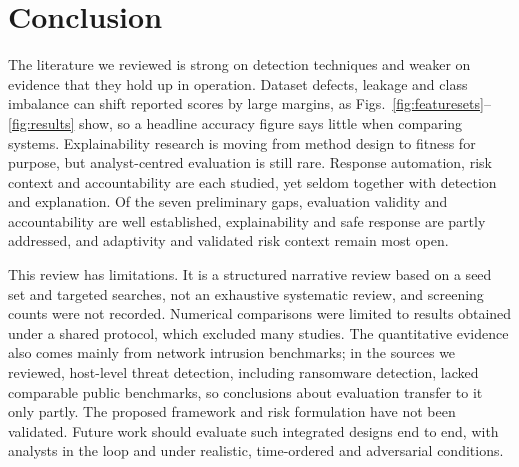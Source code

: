 \documentclass[conference]{IEEEtran}
\begin{document}
\section{Conclusion}
The literature we reviewed is strong on detection techniques and weaker on evidence that they hold up in operation. Dataset defects, leakage and class imbalance can shift reported scores by large margins, as Figs.~\ref{fig:featuresets}--\ref{fig:results} show, so a headline accuracy figure says little when comparing systems. Explainability research is moving from method design to fitness for purpose, but analyst-centred evaluation is still rare. Response automation, risk context and accountability are each studied, yet seldom together with detection and explanation. Of the seven preliminary gaps, evaluation validity and accountability are well established, explainability and safe response are partly addressed, and adaptivity and validated risk context remain most open.

This review has limitations. It is a structured narrative review based on a seed set and targeted searches, not an exhaustive systematic review, and screening counts were not recorded. Numerical comparisons were limited to results obtained under a shared protocol, which excluded many studies. The quantitative evidence also comes mainly from network intrusion benchmarks; in the sources we reviewed, host-level threat detection, including ransomware detection, lacked comparable public benchmarks, so conclusions about evaluation transfer to it only partly. The proposed framework and risk formulation have not been validated. Future work should evaluate such integrated designs end to end, with analysts in the loop and under realistic, time-ordered and adversarial conditions.

\end{document}
